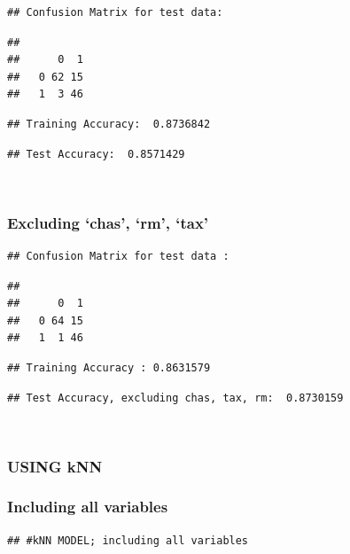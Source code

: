 \documentclass[]{article}
\begin{document}
\begin{verbatim}
## Confusion Matrix for test data:
\end{verbatim}

\begin{verbatim}
##    
##      0  1
##   0 62 15
##   1  3 46
\end{verbatim}

\begin{verbatim}
## Training Accuracy:  0.8736842
\end{verbatim}

\begin{verbatim}
## Test Accuracy:  0.8571429
\end{verbatim}

~

\subsubsection{\texorpdfstring{Excluding `chas', `rm',
`tax'}{Excluding chas, rm, tax}}\label{excluding-chas-rm-tax-1}

\begin{verbatim}
## Confusion Matrix for test data :
\end{verbatim}

\begin{verbatim}
##    
##      0  1
##   0 64 15
##   1  1 46
\end{verbatim}

\begin{verbatim}
## Training Accuracy : 0.8631579
\end{verbatim}

\begin{verbatim}
## Test Accuracy, excluding chas, tax, rm:  0.8730159
\end{verbatim}

~

\newpage

\subsubsection{USING kNN}\label{using-knn}

\subsubsection{Including all variables}\label{including-all-variables-2}

\begin{verbatim}
## #kNN MODEL; including all variables
\end{verbatim}
\end{document}
